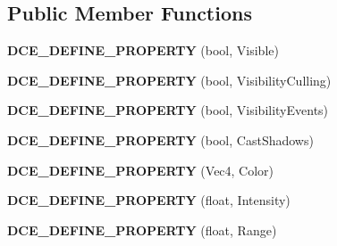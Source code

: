 \subsection*{Public Member Functions}
\begin{DoxyCompactItemize}
\item 
\hypertarget{classDCEngine_1_1Components_1_1Light_a9e61a0b0d683bbc0a78bb92940308935}{{\bfseries D\-C\-E\-\_\-\-D\-E\-F\-I\-N\-E\-\_\-\-P\-R\-O\-P\-E\-R\-T\-Y} (bool, Visible)}\label{classDCEngine_1_1Components_1_1Light_a9e61a0b0d683bbc0a78bb92940308935}

\item 
\hypertarget{classDCEngine_1_1Components_1_1Light_ade3926263b77ddfbd6e514d33a6418ef}{{\bfseries D\-C\-E\-\_\-\-D\-E\-F\-I\-N\-E\-\_\-\-P\-R\-O\-P\-E\-R\-T\-Y} (bool, Visibility\-Culling)}\label{classDCEngine_1_1Components_1_1Light_ade3926263b77ddfbd6e514d33a6418ef}

\item 
\hypertarget{classDCEngine_1_1Components_1_1Light_a5d649b916128a96edbf0b2ccd96a160d}{{\bfseries D\-C\-E\-\_\-\-D\-E\-F\-I\-N\-E\-\_\-\-P\-R\-O\-P\-E\-R\-T\-Y} (bool, Visibility\-Events)}\label{classDCEngine_1_1Components_1_1Light_a5d649b916128a96edbf0b2ccd96a160d}

\item 
\hypertarget{classDCEngine_1_1Components_1_1Light_acc035f2aab362dc8871f130579366909}{{\bfseries D\-C\-E\-\_\-\-D\-E\-F\-I\-N\-E\-\_\-\-P\-R\-O\-P\-E\-R\-T\-Y} (bool, Cast\-Shadows)}\label{classDCEngine_1_1Components_1_1Light_acc035f2aab362dc8871f130579366909}

\item 
\hypertarget{classDCEngine_1_1Components_1_1Light_a1539fdeeec6e2e75e572b00fe5fcd3a0}{{\bfseries D\-C\-E\-\_\-\-D\-E\-F\-I\-N\-E\-\_\-\-P\-R\-O\-P\-E\-R\-T\-Y} (Vec4, Color)}\label{classDCEngine_1_1Components_1_1Light_a1539fdeeec6e2e75e572b00fe5fcd3a0}

\item 
\hypertarget{classDCEngine_1_1Components_1_1Light_afb14cc04fc37c10cd3f52beb8cb133f2}{{\bfseries D\-C\-E\-\_\-\-D\-E\-F\-I\-N\-E\-\_\-\-P\-R\-O\-P\-E\-R\-T\-Y} (float, Intensity)}\label{classDCEngine_1_1Components_1_1Light_afb14cc04fc37c10cd3f52beb8cb133f2}

\item 
\hypertarget{classDCEngine_1_1Components_1_1Light_a1d485877ce6853ea76dd1e30d0338479}{{\bfseries D\-C\-E\-\_\-\-D\-E\-F\-I\-N\-E\-\_\-\-P\-R\-O\-P\-E\-R\-T\-Y} (float, Range)}\label{classDCEngine_1_1Components_1_1Light_a1d485877ce6853ea76dd1e30d0338479}


\end{DoxyCompactItemize}
